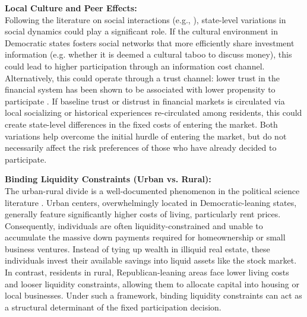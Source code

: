 \vspace{1em}
\noindent\textbf{Local Culture and Peer Effects:}\\[0.5em]
Following the literature on social interactions (e.g., \citet{hong2004}), state-level variations in social dynamics could play a significant role. If the cultural environment in Democratic states fosters social networks that more efficiently share investment information (e.g. whether it is deemed a cultural taboo to discuss money), this could lead to higher participation through an information cost channel. Alternatively, this could operate through a trust channel: lower trust in the financial system has been shown to be associated with lower propensity to participate \citep{guiso2008, giannetti2016, bu2022, huang2023}. If baseline trust or distrust in financial markets is circulated via local socializing or historical experiences re-circulated among residents, this could create state-level differences in the fixed costs of entering the market. Both variations help overcome the initial hurdle of entering the market, but do not necessarily affect the risk preferences of those who have already decided to participate.

\vspace{1em}
\noindent\textbf{Binding Liquidity Constraints (Urban vs. Rural):}\\[0.5em]
The urban-rural divide is a well-documented phenomenon in the political science literature \citep{rodden2019cities, gimpel2020}. Urban centers, overwhelmingly located in Democratic-leaning states, generally feature significantly higher costs of living, particularly rent prices. Consequently, individuals are often liquidity-constrained and unable to accumulate the massive down payments required for homeownership or small business ventures. Instead of tying up wealth in illiquid real estate, these individuals invest their available savings into liquid assets like the stock market. In contrast, residents in rural, Republican-leaning areas face lower living costs and looser liquidity constraints, allowing them to allocate capital into housing or local businesses. Under such a framework, binding liquidity constraints can act as a structural determinant of the fixed participation decision.

